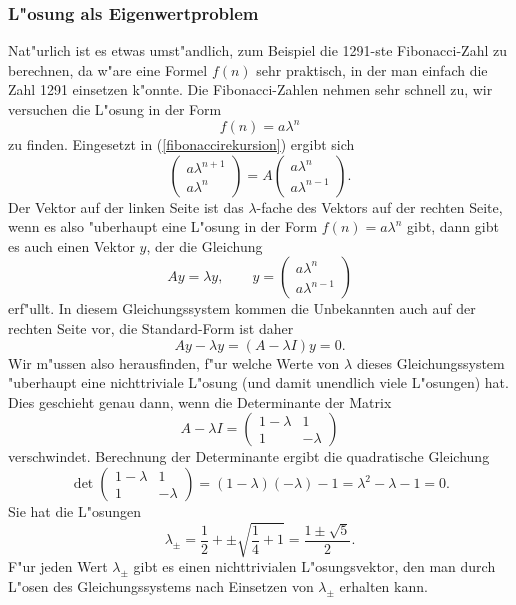 \subsubsection{L"osung als Eigenwertproblem}
Nat"urlich ist es etwas umst"andlich, zum Beispiel die 1291-ste Fibonacci-Zahl
zu berechnen, da w"are eine Formel $f(n)$ sehr praktisch, in der man einfach
die Zahl 1291 einsetzen k"onnte.
Die Fibonacci-Zahlen nehmen sehr schnell zu, 
wir versuchen die L"osung in der Form
\[
f(n)=a\lambda^n
\]
zu finden. Eingesetzt in (\ref{fibonaccirekursion}) ergibt sich
\[
\begin{pmatrix}a\lambda^{n+1}\\a\lambda^n\end{pmatrix}
=A\begin{pmatrix}a\lambda^n\\a\lambda^{n-1}\end{pmatrix}.
\]
Der Vektor auf der linken Seite ist das $\lambda$-fache des Vektors
auf der rechten Seite, wenn es also "uberhaupt eine L"osung in der
Form $f(n)=a\lambda^n$ gibt, dann gibt es auch einen Vektor $y$, der
die Gleichung
\begin{equation}
Ay=\lambda y, \qquad y=\begin{pmatrix}
a\lambda^n\\a\lambda^{n-1}
\end{pmatrix}
\end{equation}
erf"ullt. In diesem Gleichungssystem kommen die Unbekannten auch auf
der rechten Seite vor, die Standard-Form ist daher
\[
Ay-\lambda y=(A-\lambda I)y=0.
\]
Wir m"ussen also herausfinden, f"ur welche Werte von $\lambda$ dieses
Gleichungssystem "uberhaupt eine nichttriviale L"osung (und damit unendlich
viele L"osungen) hat. Dies geschieht genau dann, wenn die Determinante
der Matrix
\[
A-\lambda I=\begin{pmatrix}1-\lambda&1\\1&-\lambda\end{pmatrix}
\]
verschwindet. Berechnung der
Determinante ergibt die quadratische Gleichung
\[
\det
\begin{pmatrix}1-\lambda&1\\1&-\lambda\end{pmatrix}
=(1-\lambda)(-\lambda)-1=\lambda^2-\lambda-1=0.
\]
Sie hat die L"osungen
\[
\lambda_{\pm}=\frac12+\pm\sqrt{\frac14+1}=\frac{1\pm\sqrt{5}}2.
\]
F"ur jeden Wert $\lambda_{\pm}$ gibt es einen nichttrivialen
L"osungsvektor, den man durch L"osen des Gleichungssystems nach
Einsetzen von $\lambda_{\pm}$ erhalten kann. 

